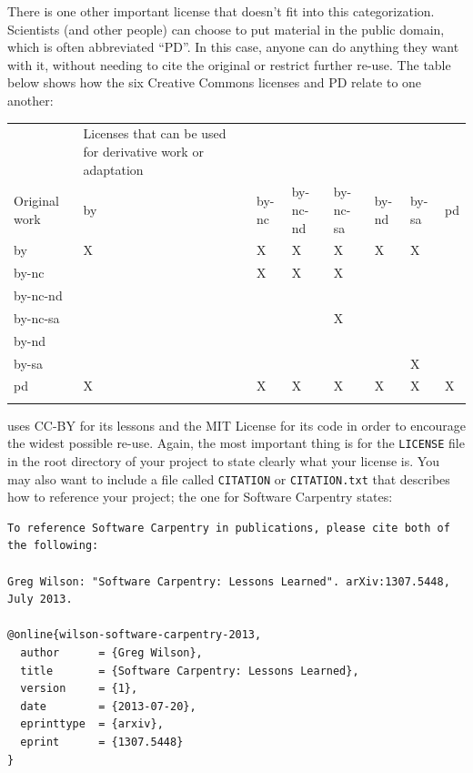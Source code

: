 \documentclass{book}
\begin{document}
There is one other important license that doesn't fit into this
categorization. Scientists (and other people) can choose to put material
in the public domain, which is often abbreviated ``PD''. In this case,
anyone can do anything they want with it, without needing to cite the
original or restrict further re-use. The table below shows how the six
Creative Commons licenses and PD relate to one another:

\begin{tabular}{llllllll}
\hline\noalign{\medskip}
& Licenses that can be used for derivative work or adaptation
\\\noalign{\medskip}
Original work & by & by-nc & by-nc-nd & by-nc-sa & by-nd & by-sa & pd
\\\noalign{\medskip}
by & X & X & X & X & X & X &
\\\noalign{\medskip}
by-nc & & X & X & X & & &
\\\noalign{\medskip}
by-nc-nd & & & & & & &
\\\noalign{\medskip}
by-nc-sa & & & & X & & &
\\\noalign{\medskip}
by-nd & & & & & & &
\\\noalign{\medskip}
by-sa & & & & & & X &
\\\noalign{\medskip}
pd & X & X & X & X & X & X & X
\\\noalign{\medskip}
\hline
\end{tabular}

uses CC-BY for its lessons and the MIT License for its code in order to
encourage the widest possible re-use. Again, the most important thing is
for the \texttt{LICENSE} file in the root directory of your project to
state clearly what your license is. You may also want to include a file
called \texttt{CITATION} or \texttt{CITATION.txt} that describes how to
reference your project; the one for Software Carpentry states:

\begin{verbatim}
To reference Software Carpentry in publications, please cite both of the following:

Greg Wilson: "Software Carpentry: Lessons Learned". arXiv:1307.5448, July 2013.

@online{wilson-software-carpentry-2013,
  author      = {Greg Wilson},
  title       = {Software Carpentry: Lessons Learned},
  version     = {1},
  date        = {2013-07-20},
  eprinttype  = {arxiv},
  eprint      = {1307.5448}
}
\end{verbatim}
\end{document}
